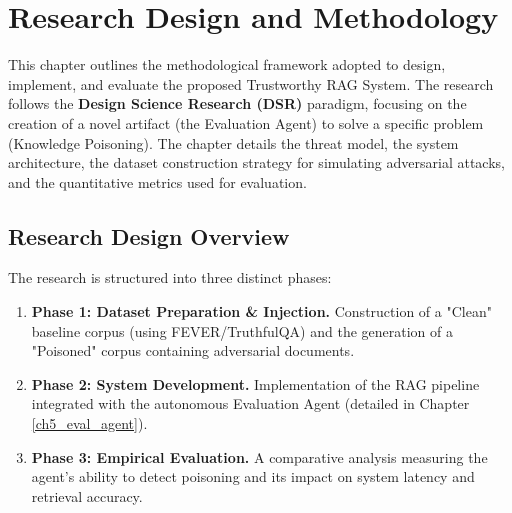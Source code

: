 



\chapter{Research Design and Methodology}
\label{ch4_methodology}

This chapter outlines the methodological framework adopted to design, implement, and evaluate the proposed Trustworthy RAG System. The research follows the \textbf{Design Science Research (DSR)} paradigm, focusing on the creation of a novel artifact (the Evaluation Agent) to solve a specific problem (Knowledge Poisoning). The chapter details the threat model, the system architecture, the dataset construction strategy for simulating adversarial attacks, and the quantitative metrics used for evaluation.

\section{Research Design Overview}
\label{sec:design_overview}

The research is structured into three distinct phases:
\begin{enumerate}
    \item \textbf{Phase 1: Dataset Preparation \& Injection.} Construction of a "Clean" baseline corpus (using FEVER/TruthfulQA) and the generation of a "Poisoned" corpus containing adversarial documents.
    \item \textbf{Phase 2: System Development.} Implementation of the RAG pipeline integrated with the autonomous Evaluation Agent (detailed in Chapter \ref{ch5_eval_agent}).
    \item \textbf{Phase 3: Empirical Evaluation.} A comparative analysis measuring the agent's ability to detect poisoning and its impact on system latency and retrieval accuracy.
\end{enumerate}

